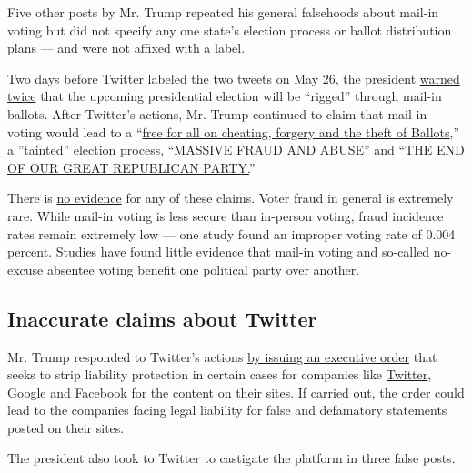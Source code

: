 Five other posts by Mr. Trump repeated his general falsehoods about
mail-in voting but did not specify any one state's election process or
ballot distribution plans --- and were not affixed with a label.

Two days before Twitter labeled the two tweets on May 26, the president
\href{https://twitter.com/realDonaldTrump/status/1264717545787006976}{warned}
\href{https://twitter.com/realDonaldTrump/status/1264558926021959680}{twice}
that the upcoming presidential election will be ``rigged'' through
mail-in ballots. After Twitter's actions, Mr. Trump continued to claim
that mail-in voting would lead to a
``\href{https://twitter.com/realDonaldTrump/status/1265601615261827072}{free
for all on cheating, forgery and the theft of Ballots},'' a
\href{https://twitter.com/realDonaldTrump/status/1266047584038256640}{''tainted''
election process},
``\href{https://twitter.com/realDonaldTrump/status/1266172570983940101}{MASSIVE
FRAUD AND ABUSE'' and ``THE END OF OUR GREAT REPUBLICAN PARTY.}''

There is
\href{https://www.nytimes3xbfgragh.onion/2020/05/20/us/politics/trump-mail-in-voting-absentee-ballots.html}{no
evidence} for any of these claims. Voter fraud in general is extremely
rare. While mail-in voting is less secure than in-person voting, fraud
incidence rates remain extremely low --- one study found an improper
voting rate of 0.004 percent. Studies have found little evidence that
mail-in voting and so-called no-excuse absentee voting benefit one
political party over another.

\hypertarget{inaccurate-claims-about-twitter}{%
\subsection{Inaccurate claims about
Twitter}\label{inaccurate-claims-about-twitter}}

Mr. Trump responded to Twitter's actions
\href{https://www.nytimes3xbfgragh.onion/2020/05/28/us/politics/trump-jack-dorsey.html}{by
issuing an executive order} that seeks to strip liability protection in
certain cases for companies like
\href{https://www.nytimes3xbfgragh.onion/2020/05/29/technology/trump-twitter.html}{Twitter},
Google and Facebook for the content on their sites. If carried out, the
order could lead to the companies facing legal liability for false and
defamatory statements posted on their sites.

The president also took to Twitter to castigate the platform in three
false posts.

